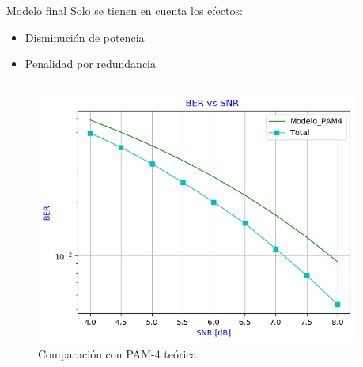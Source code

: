 \documentclass[xcolor=table]{beamer}
\begin{document}
\begin{frame}{Modelo final}
Solo se tienen en cuenta los efectos:
\begin{itemize}
    \item Disminución de potencia
    \item Penalidad por redundancia 
 \end{itemize}
 
 
 \vspace{0.5cm}
\begin{columns}
    \begin{column}{0.48\paperwidth}
    \begin{figure}
        \centering
        \includegraphics[width=\textwidth]{Graficos/BER_vs_SNR_4.png}%
        \caption{Comparación con PAM-4 teórica}
        \label{fig:my_label}
    \end{figure}
    
    
    \end{column}
    \begin{column}{0.48\paperwidth}  
    

\end{column}
\end{columns}
\end{frame}
\end{document}

